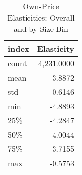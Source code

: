 \begin{table}[!htbp]
\centering
\caption{Own-Price Elasticities: Overall and by Size Bin}
\label{tab:own_elasticities}
\begin{tabular}{lr}
\toprule
index & Elasticity \\
\midrule
count & 4,231.0000 \\
mean & -3.8872 \\
std & 0.6146 \\
min & -4.8893 \\
25\% & -4.2847 \\
50\% & -4.0044 \\
75\% & -3.7155 \\
max & -0.5753 \\
\bottomrule
\end{tabular}

\end{table}
